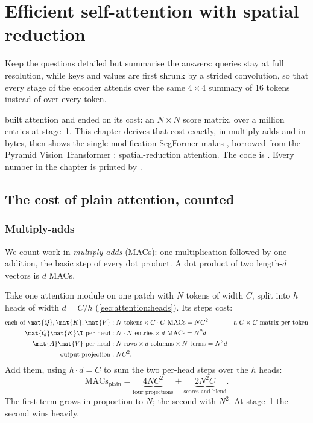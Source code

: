 \chapter{Efficient self-attention with spatial reduction}\label{ch:esa}

\begin{onething}
Keep the questions detailed but summarise the answers: queries stay at full resolution, while
keys and values are first shrunk by a strided convolution, so that every stage of the encoder
attends over the same $4\times4$ summary of 16 tokens instead of over every token.
\end{onething}

 built attention and ended on its cost: an $N\times N$ score matrix, over a
million entries at stage~1. This chapter derives that cost exactly, in multiply-adds and in bytes,
then shows the single modification SegFormer makes \citep{xie2021segformer}, borrowed from the
Pyramid Vision Transformer \citep{wang2021pyramid}: spatial-reduction attention. The code is
. Every number in the chapter
is printed by .

\section{The cost of plain attention, counted}\label{sec:esa:cost}

\subsection{Multiply-adds}

We count work in \emph{multiply-adds} (MACs): one multiplication followed by
one addition, the basic step of every dot product. A dot product of two length-$d$ vectors is
$d$ MACs.

Take one attention module on one patch with $N$ tokens of width $C$, split into $h$ heads of
width $d = C/h$ (\cref{sec:attention:heads}). Its steps cost:
\begin{align*}
  \text{each of } \mat{Q}, \mat{K}, \mat{V} &: N \text{ tokens} \times C\cdot C \text{ MACs} = NC^2 && \text{a } C\times C \text{ matrix per token}\\
  \mat{Q}\mat{K}\T \text{ per head} &: N\cdot N \text{ entries} \times d \text{ MACs} = N^2 d\\
  \mat{A}\mat{V} \text{ per head} &: N \text{ rows} \times d \text{ columns} \times N \text{ terms} = N^2 d\\
  \text{output projection} &: NC^2 .
\end{align*}
Add them, using $h\cdot d = C$ to sum the two per-head steps over the $h$ heads:
\begin{equation}\label{eq:esa:plaincost}
  \text{MACs}_\text{plain} = \underbrace{4NC^2}_{\text{four projections}} + \underbrace{2N^2C}_{\text{scores and blend}} .
\end{equation}
The first term grows in proportion to $N$; the second with $N^2$. At stage~1 the second wins
heavily.

